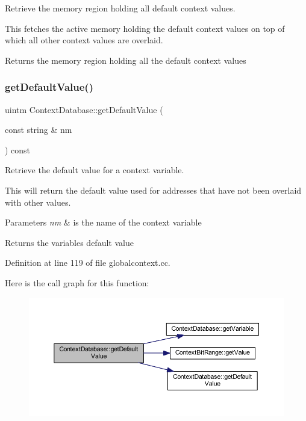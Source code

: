Retrieve the memory region holding all default context values. 

This fetches the active memory holding the default context values on top of which all other context values are overlaid. \begin{DoxyReturn}{Returns}
the memory region holding all the default context values 
\end{DoxyReturn}
\mbox{\label{class_context_database_a8da40f85a0fa7a8af508f1df35c3de06}} 
\subsubsection{\texorpdfstring{getDefaultValue()}{getDefaultValue()}\hspace{0.1cm}{\footnotesize\ttfamily [3/3]}}
{\footnotesize\ttfamily uintm Context\+Database\+::get\+Default\+Value (\begin{DoxyParamCaption}\item[{const string \&}]{nm }\end{DoxyParamCaption}) const}



Retrieve the default value for a context variable. 

This will return the default value used for addresses that have not been overlaid with other values. 
\begin{DoxyParams}{Parameters}
{\em nm} & is the name of the context variable \\
\hline
\end{DoxyParams}
\begin{DoxyReturn}{Returns}
the variable\textquotesingle{}s default value 
\end{DoxyReturn}


Definition at line 119 of file globalcontext.\+cc.

Here is the call graph for this function\+:
\nopagebreak
\begin{figure}[H]
\begin{center}
\leavevmode
\includegraphics[width=350pt]{class_context_database_a8da40f85a0fa7a8af508f1df35c3de06_cgraph}
\end{center}
\end{figure}
\mbox{\label{class_context_database_a0b1179b61de5ead9bc606d37231b6d24}} 
